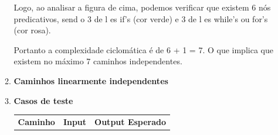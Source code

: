 \documentclass{article}
\begin{document}
\begin{itemize}
\begin{enumerate}
    \quad Logo, ao analisar a figura de cima, podemos verificar que existem 6 nós predicativos, send o  3  de l es if's (cor verde)  e  3  de l es while's ou for's (cor rosa).
  
    Portanto a complexidade ciclomática é de 6 + 1 = 7. O que implica que existem no máximo 7 caminhos independentes.
    
    \item \textbf{Caminhos linearmente independentes}
    \item \textbf{Casos de teste}
    
\begin{table}[H]
    \centering
    \begin{tabular}{|c|p{7cm}|p{3cm}|} %
    \hline
    \textbf{Caminho} & \textbf{Input} & \textbf{Output Esperado} \\
                        

\end{tabular}
\end{table}
\end{enumerate}
\end{itemize}
\end{document}
